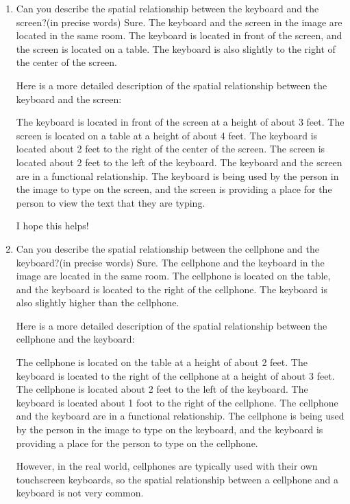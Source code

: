 \begin{enumerate}
    \item Can you describe the spatial relationship between the keyboard and the screen?(in precise words)
    \subitem Sure. The keyboard and the screen in the image are located in the same room. The keyboard is located in front of the screen, and the screen is located on a table. The keyboard is also slightly to the right of the center of the screen.

    Here is a more detailed description of the spatial relationship between the keyboard and the screen:
    
    The keyboard is located in front of the screen at a height of about 3 feet.
    The screen is located on a table at a height of about 4 feet.
    The keyboard is located about 2 feet to the right of the center of the screen.
    The screen is located about 2 feet to the left of the keyboard.
    The keyboard and the screen are in a functional relationship. The keyboard is being used by the person in the image to type on the screen, and the screen is providing a place for the person to view the text that they are typing.
    
    I hope this helps!
    \item Can you describe the spatial relationship between the cellphone and the keyboard?(in precise words)
    \subitem 
    Sure. The cellphone and the keyboard in the image are located in the same room. The cellphone is located on the table, and the keyboard is located to the right of the cellphone. The keyboard is also slightly higher than the cellphone.
    
    Here is a more detailed description of the spatial relationship between the cellphone and the keyboard:
    
    The cellphone is located on the table at a height of about 2 feet.
    The keyboard is located to the right of the cellphone at a height of about 3 feet.
    The cellphone is located about 2 feet to the left of the keyboard.
    The keyboard is located about 1 foot to the right of the cellphone.
    The cellphone and the keyboard are in a functional relationship. The cellphone is being used by the person in the image to type on the keyboard, and the keyboard is providing a place for the person to type on the cellphone.
    
    However, in the real world, cellphones are typically used with their own touchscreen keyboards, so the spatial relationship between a cellphone and a keyboard is not very common.
    

\end{enumerate}
